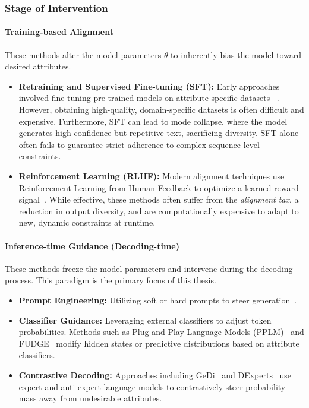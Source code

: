 \documentclass[11pt]{article}
\begin{document}
\subsubsection{Stage of Intervention}

\paragraph{Training-based Alignment}
These methods alter the model parameters $\theta$ to inherently bias the model toward desired attributes.

\begin{itemize}
    \item \textbf{Retraining and Supervised Fine-tuning (SFT):} Early approaches involved fine-tuning pre-trained models on attribute-specific datasets 
    ~\cite{alhafni2024personalizedtextgenerationfinegrained}. However, obtaining high-quality, domain-specific datasets is often difficult and expensive. Furthermore, SFT can lead to mode collapse, where the model generates high-confidence but repetitive text, sacrificing diversity. SFT alone often fails to guarantee strict adherence to complex sequence-level constraints.
    \item \textbf{Reinforcement Learning (RLHF):} Modern alignment techniques use Reinforcement Learning from Human Feedback to optimize a learned reward signal~\cite{ouyang2022traininglanguagemodelsfollow, li2024reinforcementlearningtokenlevelfeedback}. While effective, these methods often suffer from the \emph{alignment tax}, a reduction in output diversity, and are computationally expensive to adapt to new, dynamic constraints at runtime.
\end{itemize}

\paragraph{Inference-time Guidance (Decoding-time)}
These methods freeze the model parameters and intervene during the decoding process. This paradigm is the primary focus of this thesis.

\begin{itemize}
    \item \textbf{Prompt Engineering:} Utilizing soft or hard prompts to steer generation~\cite{ouyang2022traininglanguagemodelsfollow}.
    \item \textbf{Classifier Guidance:} Leveraging external classifiers to adjust token probabilities. Methods such as Plug and Play Language Models (PPLM)~\cite{dathathri2020plugplaylanguagemodels} and FUDGE~\cite{Yang_2021} modify hidden states or predictive distributions based on attribute classifiers.
    \item \textbf{Contrastive Decoding:} Approaches including GeDi~\cite{krause-etal-2021-gedi-generative} and DExperts~\cite{liu-etal-2021-dexperts} use expert and anti-expert language models to contrastively steer probability mass away from undesirable attributes.
\end{itemize}
\end{document}

